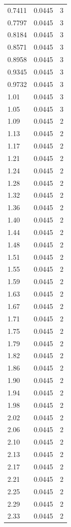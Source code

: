 \begin{longtable}{lrr}
  0.7411 & 0.0445 & 3 \\
  0.7797 & 0.0445 & 3 \\
  0.8184 & 0.0445 & 3 \\
  0.8571 & 0.0445 & 3 \\
  0.8958 & 0.0445 & 3 \\
  0.9345 & 0.0445 & 3 \\
  0.9732 & 0.0445 & 3 \\
  1.01 & 0.0445 & 3 \\
  1.05 & 0.0445 & 3 \\
  1.09 & 0.0445 & 2 \\
  1.13 & 0.0445 & 2 \\
  1.17 & 0.0445 & 2 \\
  1.21 & 0.0445 & 2 \\
  1.24 & 0.0445 & 2 \\
  1.28 & 0.0445 & 2 \\
  1.32 & 0.0445 & 2 \\
  1.36 & 0.0445 & 2 \\
  1.40 & 0.0445 & 2 \\
  1.44 & 0.0445 & 2 \\
  1.48 & 0.0445 & 2 \\
  1.51 & 0.0445 & 2 \\
  1.55 & 0.0445 & 2 \\
  1.59 & 0.0445 & 2 \\
  1.63 & 0.0445 & 2 \\
  1.67 & 0.0445 & 2 \\
  1.71 & 0.0445 & 2 \\
  1.75 & 0.0445 & 2 \\
  1.79 & 0.0445 & 2 \\
  1.82 & 0.0445 & 2 \\
  1.86 & 0.0445 & 2 \\
  1.90 & 0.0445 & 2 \\
  1.94 & 0.0445 & 2 \\
  1.98 & 0.0445 & 2 \\
  2.02 & 0.0445 & 2 \\
  2.06 & 0.0445 & 2 \\
  2.10 & 0.0445 & 2 \\
  2.13 & 0.0445 & 2 \\
  2.17 & 0.0445 & 2 \\
  2.21 & 0.0445 & 2 \\
  2.25 & 0.0445 & 2 \\
  2.29 & 0.0445 & 2 \\
  2.33 & 0.0445 & 2 \\

\end{longtable}
